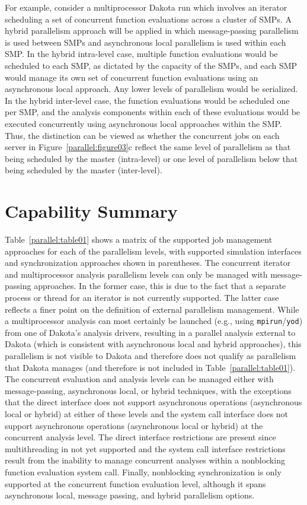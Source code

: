 For example, consider a multiprocessor Dakota run which involves an
iterator scheduling a set of concurrent function evaluations across a
cluster of SMPs. A hybrid parallelism approach will be applied in
which message-passing parallelism is used between SMPs and
asynchronous local parallelism is used within each SMP. In the hybrid
intra-level case, multiple function evaluations would be scheduled to
each SMP, as dictated by the capacity of the SMPs, and each SMP would
manage its own set of concurrent function evaluations using an
asynchronous local approach. Any lower levels of parallelism would be
serialized. In the hybrid inter-level case, the function evaluations
would be scheduled one per SMP, and the analysis components within
each of these evaluations would be executed concurrently using
asynchronous local approaches within the SMP. Thus, the distinction
can be viewed as whether the concurrent jobs on each server in
Figure~\ref{parallel:figure03}c reflect the same level of parallelism
as that being scheduled by the master (intra-level) or one level of
parallelism below that being scheduled by the master (inter-level).


\section{Capability Summary}\label{parallel:summary}


Table~\ref{parallel:table01} shows a matrix of the supported job
management approaches for each of the parallelism levels, with
supported simulation interfaces and synchronization approaches shown
in parentheses. The concurrent iterator and multiprocessor analysis
parallelism levels can only be managed with message-passing
approaches. In the former case, this is due to the fact that a
separate process or thread for an iterator is not currently supported.
The latter case reflects a finer point on the definition of external
parallelism management. While a multiprocessor analysis can most
certainly be launched (e.g., using \texttt{mpirun}/\texttt{yod}) from
one of Dakota's analysis drivers, resulting in a parallel analysis
external to Dakota (which is consistent with asynchronous local and
hybrid approaches), this parallelism is not visible to Dakota and
therefore does not qualify as parallelism that Dakota manages (and
therefore is not included in Table~\ref{parallel:table01}). The
concurrent evaluation and analysis levels can be managed either with
message-passing, asynchronous local, or hybrid techniques, with the
exceptions that the direct interface does not support asynchronous
operations (asynchronous local or hybrid) at either of these levels
and the system call interface does not support asynchronous operations
(asynchronous local or hybrid) at the concurrent analysis level. The
direct interface restrictions are present since multithreading in not
yet supported and the system call interface restrictions result from
the inability to manage concurrent analyses within a nonblocking
function evaluation system call.  Finally, nonblocking synchronization
is only supported at the concurrent function evaluation level,
although it spans asynchronous local, message passing, and hybrid
parallelism options.


